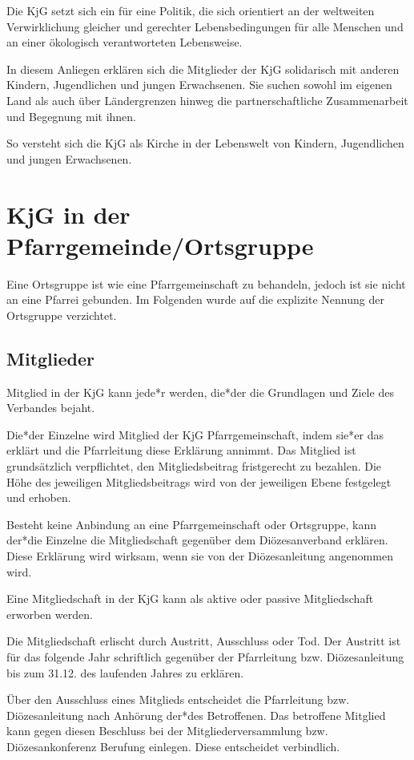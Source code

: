 \documentclass[12pt]{report}
\begin{document}
\begin{justify}
Die KjG setzt sich ein für eine Politik, die sich orientiert an der weltweiten Verwirklichung gleicher
und gerechter Lebensbedingungen für alle Menschen und an einer
ökologisch verantworteten Lebensweise.

In diesem Anliegen erklären sich die Mitglieder der KjG solidarisch mit anderen Kindern, Jugendlichen und jungen Erwachsenen.
Sie suchen sowohl im eigenen Land als auch über Ländergrenzen
hinweg die partnerschaftliche Zusammenarbeit und Begegnung mit ihnen.

So versteht sich die KjG als Kirche in der Lebenswelt von Kindern, Jugendlichen und jungen Erwachsenen.

\chapter{KjG in der Pfarrgemeinde/Ortsgruppe}
Eine Ortsgruppe ist wie eine Pfarrgemeinschaft zu behandeln, jedoch ist sie nicht an eine Pfarrei
gebunden. Im Folgenden wurde auf die explizite Nennung der Ortsgruppe verzichtet.
\section{Mitglieder}
Mitglied in der KjG kann jede*r werden, die*der die Grundlagen und Ziele des Verbandes bejaht.

Die*der Einzelne wird Mitglied der KjG Pfarrgemeinschaft, indem sie*er das erklärt und die Pfarrleitung diese Erklärung annimmt.
Das Mitglied ist grundsätzlich verpflichtet, den Mitgliedsbeitrag fristgerecht zu bezahlen.
Die Höhe des jeweiligen Mitgliedsbeitrags wird von der jeweiligen
Ebene festgelegt und erhoben.

Besteht keine Anbindung an eine Pfarrgemeinschaft oder Ortsgruppe, kann der*die Einzelne
die Mitgliedschaft gegenüber dem Diözesanverband erklären. Diese Erklärung wird wirksam,
wenn sie von der Diözesanleitung angenommen wird.

Eine Mitgliedschaft in der KjG kann als aktive oder passive Mitgliedschaft erworben werden.

Die Mitgliedschaft erlischt durch Austritt, Ausschluss oder Tod. Der Austritt ist für das folgende Jahr
schriftlich gegenüber der Pfarrleitung bzw. Diözesanleitung bis zum 31.12. des laufenden Jahres zu erklären.

Über den Ausschluss eines Mitglieds entscheidet die Pfarrleitung bzw. Diözesanleitung nach Anhörung der*des Betroffenen.
Das betroffene Mitglied kann gegen diesen Beschluss bei der
Mitgliederversammlung bzw. Diözesankonferenz Berufung einlegen. Diese entscheidet verbindlich.

\end{justify}
\end{document}
